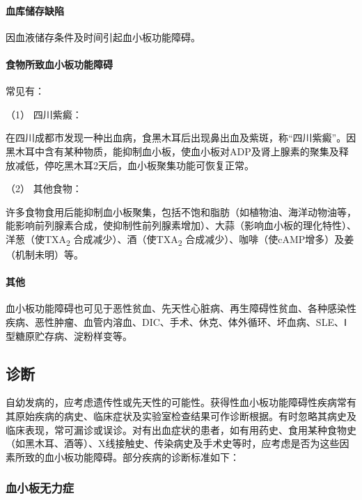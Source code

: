 \paragraph{血库储存缺陷}

因血液储存条件及时间引起血小板功能障碍。

\paragraph{食物所致血小板功能障碍}

常见有：

\hypertarget{text00333.htmlux5cux23CHP12-1-3-1-2-6-1}{}
（1） 四川紫癜：

在四川成都市发现一种出血病，食黑木耳后出现鼻出血及紫斑，称“四川紫癜”。因黑木耳中含有某种物质，能抑制血小板，使血小板对ADP及肾上腺素的聚集及释放减低，停吃黑木耳2天后，血小板聚集功能可恢复正常。

\hypertarget{text00333.htmlux5cux23CHP12-1-3-1-2-6-2}{}
（2） 其他食物：

许多食物食用后能抑制血小板聚集，包括不饱和脂肪（如植物油、海洋动物油等，能影响前列腺素合成，使抑制性前列腺素增加）、大蒜（影响血小板的理化特性）、洋葱（使TXA\textsubscript{2}
合成减少）、酒（使TXA\textsubscript{2}
合成减少）、咖啡（使cAMP增多）及姜（机制未明）等。

\paragraph{其他}

血小板功能障碍也可见于恶性贫血、先天性心脏病、再生障碍性贫血、各种感染性疾病、恶性肿瘤、血管内溶血、DIC、手术、休克、体外循环、坏血病、SLE、Ⅰ型糖原贮存病、淀粉样变等。

\subsection{诊断}

自幼发病的，应考虑遗传性或先天性的可能性。获得性血小板功能障碍性疾病常有其原始疾病的病史、临床症状及实验室检查结果可作诊断根据。有时忽略其病史及临床表现，常可漏诊或误诊。对有出血症状的患者，如有用药史、食用某种食物史（如黑木耳、酒等）、X线接触史、传染病史及手术史等时，应考虑是否为这些因素所致的血小板功能障碍。部分疾病的诊断标准如下：

\subsubsection{血小板无力症}

